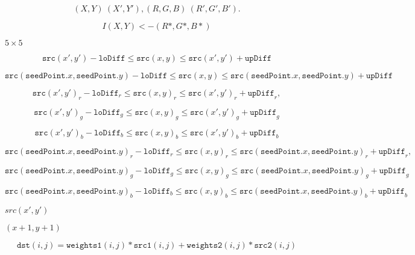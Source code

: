 \documentclass{article}
\begin{document}
\[(X,Y)~(X',Y'), (R,G,B)~(R',G',B').\]
\pagebreak

\[I(X,Y) <- (R*,G*,B*)\]
\pagebreak

$5\times 5$
\pagebreak

\[\texttt{src} (x',y')- \texttt{loDiff} \leq \texttt{src} (x,y) \leq \texttt{src} (x',y')+ \texttt{upDiff}\]
\pagebreak

\[\texttt{src} ( \texttt{seedPoint} .x, \texttt{seedPoint} .y)- \texttt{loDiff} \leq \texttt{src} (x,y) \leq \texttt{src} ( \texttt{seedPoint} .x, \texttt{seedPoint} .y)+ \texttt{upDiff}\]
\pagebreak

\[\texttt{src} (x',y')_r- \texttt{loDiff} _r \leq \texttt{src} (x,y)_r \leq \texttt{src} (x',y')_r+ \texttt{upDiff} _r,\]
\pagebreak

\[\texttt{src} (x',y')_g- \texttt{loDiff} _g \leq \texttt{src} (x,y)_g \leq \texttt{src} (x',y')_g+ \texttt{upDiff} _g\]
\pagebreak

\[\texttt{src} (x',y')_b- \texttt{loDiff} _b \leq \texttt{src} (x,y)_b \leq \texttt{src} (x',y')_b+ \texttt{upDiff} _b\]
\pagebreak

\[\texttt{src} ( \texttt{seedPoint} .x, \texttt{seedPoint} .y)_r- \texttt{loDiff} _r \leq \texttt{src} (x,y)_r \leq \texttt{src} ( \texttt{seedPoint} .x, \texttt{seedPoint} .y)_r+ \texttt{upDiff} _r,\]
\pagebreak

\[\texttt{src} ( \texttt{seedPoint} .x, \texttt{seedPoint} .y)_g- \texttt{loDiff} _g \leq \texttt{src} (x,y)_g \leq \texttt{src} ( \texttt{seedPoint} .x, \texttt{seedPoint} .y)_g+ \texttt{upDiff} _g\]
\pagebreak

\[\texttt{src} ( \texttt{seedPoint} .x, \texttt{seedPoint} .y)_b- \texttt{loDiff} _b \leq \texttt{src} (x,y)_b \leq \texttt{src} ( \texttt{seedPoint} .x, \texttt{seedPoint} .y)_b+ \texttt{upDiff} _b\]
\pagebreak

$src(x',y')$
\pagebreak

$(x+1, y+1)$
\pagebreak

\[ \texttt{dst}(i,j) = \texttt{weights1}(i,j)*\texttt{src1}(i,j) + \texttt{weights2}(i,j)*\texttt{src2}(i,j) \]
\pagebreak
\end{document}

